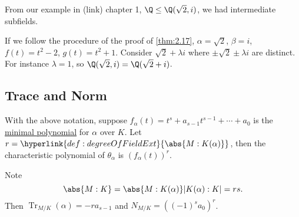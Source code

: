 \documentclass{article}
\DeclareMathOperator{\Tr}{Tr}
\begin{document}
\begin{eg}
    From our example in (link) chapter 1, $\Q \leq \Q(\sqrt{2}, i)$, we had intermediate subfields.
    \begin{center}
    \end{center}
    If we follow the procedure of the proof of \cref{thm:2.17}, $\alpha = \sqrt{2}$, $\beta = i$, $f(t) = t^2 - 2$, $g(t) = t^2 + 1$.
    Consider $\sqrt{2} + \lambda i$ where $\pm \sqrt{2} \pm \lambda i$ are distinct.
    For instance $\lambda = 1$, so $\Q(\sqrt{2}, i) = \Q(\sqrt{2}+i)$.
\end{eg}

\subsection{Trace and Norm}


\begin{nthm}\label{thm:2.19}
    With the above notation, suppose $f_\alpha(t) = t^s + a_{s-1} t^{s-1} + \dotsb + a_0$ is the \hyperlink{def:minimalPoly}{minimal polynomial} for $\alpha$ over $K$.
    Let $r = \hyperlink{def:degreeOfFieldExt}{\abs{M:K(\alpha)}}$, then the characteristic polynomial of $\theta_\alpha$ is $(f_\alpha(t))^r$.

    Note \begin{equation*}\abs{M:K} = \abs{M:K(\alpha)} |K(\alpha) : K| = rs.\end{equation*}
    Then $\Tr_{M/K} (\alpha) = -r a_{s-1}$ and $N_{M/K} = ((-1)^s a_0)^r$.
\end{nthm}
\end{document}
